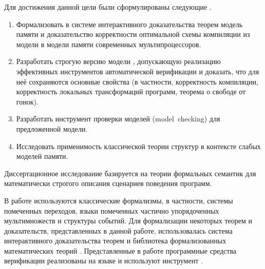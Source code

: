 Для достижения данной цели были сформулированы следующие {\tasks}.
\begin{enumerate}[beginpenalty=10000] %
  \item
    Формализовать в системе интерактивного доказательства теорем \coq модель памяти \Wkm и
    доказательство корректности оптимальной схемы компиляции
    из модели \Wkm в модели памяти современных мультипроцессоров.
  \item
    Разработать строгую версию модели \Wkm, 
    допускающую реализацию эффективных инструментов автоматической верификации
    и доказать, что для неё сохраняются основные свойства \Wkm  
    (в частности, корректность компиляции, корректность локальных трансформаций программ, 
     теорема о свободе от гонок).
  \item
    Разработать инструмент проверки моделей (model~checking) для предложенной модели.
  \item
    Исследовать применимость классической теории структур в контексте слабых моделей памяти.
\end{enumerate}

{\methods} Диссертационное исследование базируется на теории формальных семантик
для математически строгого описания сценариев поведения  программ. 

В работе используются классические формализмы, в частности, 
системы помеченных переходов, языки помеченных частично 
упорядоченных мультимножеств и структуры событий. Для формализации некоторых теорем и доказательств, представленных в данной работе, 
использовалась система интерактивного доказательства теорем \coq 
и библиотека формализованных математических теорий \mathcomp. Представленные в работе  программные средства верификации  реализованы на языке \CLANG и используют инструмент \genmc.  

